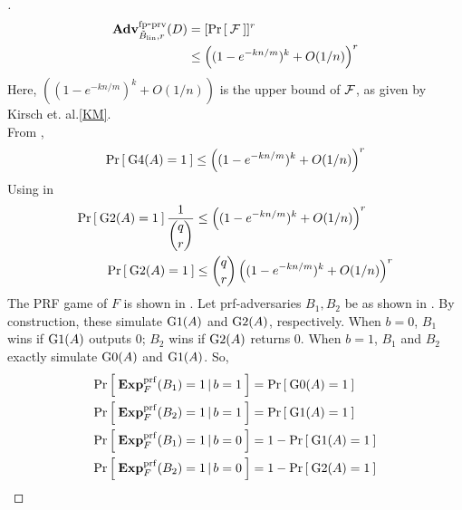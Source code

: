 \begin{proof}[]
\begin{align}
\nonumber \mathrm{\mathbf{Adv}}^{\mathrm{fp\mbox{-}prv}}_{\tilde{B}_{\mathrm{lin}},r}(D) &= [\Pr\left[\: {\cal F} \:\right]]^r\\
&\leq \left( (1-e^{-kn/m})^k + O(1/n) \right)^r \label{eq:8}
\end{align}
Here, $\left( (1-e^{-kn/m})^k + O(1/n) \right)$ is the upper bound of ${\cal F}$, as given by Kirsch et. al.\ref{KM}.\\
From ,
\begin{equation}
\Pr\left[\: \text{G4}(A)=1 \:\right] \leq  \left( (1-e^{-kn/m})^k + O(1/n) \right)^r \label{eq:9}
\end{equation}
Using  in 
\begin{align}
\Pr\left[\: \text{G2}(A)=1 \:\right]\frac{1}{\dbinom{q}{r}} & \leq  \left( (1-e^{-kn/m})^k + O(1/n) \right)^r\\
\Pr\left[\: \text{G2}(A)=1 \:\right] &\leq \dbinom{q}{r}\left( (1-e^{-kn/m})^k + O(1/n) \right)^r\label{eq:10}
\end{align}
The PRF game of $F$ is shown in . Let prf-adversaries $B_1, B_2$ be as shown in .  By
construction, these simulate $\text{G1}(A)$ and $\text{G2}(A)$, respectively. When $b=0$, $B_1$ wins if $\text{G1}(A)$ outputs 0; $B_2$ wins if $\text{G2}(A)$ returns 0. When $b=1$, $B_1$ and $B_2$ exactly simulate $\text{G0}(A)$ and $\text{G1}(A)$. So, 
\begin{align}
\Pr\left[\: \mathbf{Exp}^{\mathrm{prf}}_{F}(B_1) = 1\,|\,b=1 \:\right] &= \Pr\left[\: \text{G0}(A)=1 \:\right]\label{eq:m1}\\
\Pr\left[\: \mathbf{Exp}^{\mathrm{prf}}_{F}(B_2) = 1\,|\,b=1 \:\right] &= \Pr\left[\: \text{G1}(A)=1 \:\right]\label{eq:m2}\\
\Pr\left[\: \mathbf{Exp}^{\mathrm{prf}}_{F}(B_1) = 1\,|\,b=0 \:\right] &= 1-\Pr\left[\: \text{G1}(A)=1 \:\right]\label{eq:m3}\\
\Pr\left[\: \mathbf{Exp}^{\mathrm{prf}}_{F}(B_2) = 1\,|\,b=0 \:\right] &= 1-\Pr\left[\: \text{G2}(A)=1 \:\right]\label{eq:m4}
\end{align}


\end{proof}
